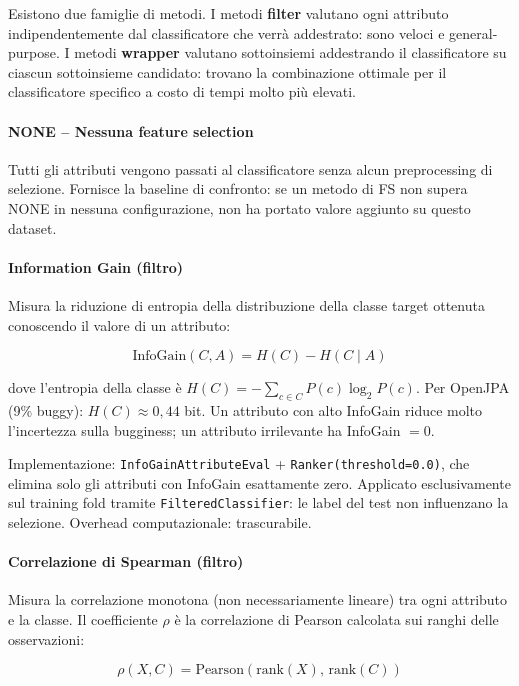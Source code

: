 Esistono due famiglie di metodi. I metodi \textbf{filter} valutano ogni attributo
indipendentemente dal classificatore che verrà addestrato: sono veloci e general-purpose.
I metodi \textbf{wrapper} valutano sottoinsiemi addestrando il classificatore su ciascun
sottoinsieme candidato: trovano la combinazione ottimale per il classificatore specifico
a costo di tempi molto più elevati.

\paragraph{NONE -- Nessuna feature selection}

Tutti gli attributi vengono passati al classificatore senza alcun preprocessing di
selezione. Fornisce la baseline di confronto: se un metodo di FS non supera NONE in
nessuna configurazione, non ha portato valore aggiunto su questo dataset.

\paragraph{Information Gain (filtro)}

Misura la riduzione di entropia della distribuzione della classe target ottenuta
conoscendo il valore di un attributo:

\[
\text{InfoGain}(C, A) = H(C) - H(C \mid A)
\]

dove l'entropia della classe è $H(C) = -\sum_{c \in C} P(c) \log_2 P(c)$. Per OpenJPA
(9\% buggy): $H(C) \approx 0{,}44$ bit. Un attributo con alto InfoGain riduce molto
l'incertezza sulla bugginess; un attributo irrilevante ha InfoGain $= 0$.

Implementazione: \texttt{InfoGainAttributeEval} + \texttt{Ranker(threshold=0.0)}, che
elimina solo gli attributi con InfoGain esattamente zero. Applicato esclusivamente sul
training fold tramite \texttt{FilteredClassifier}: le label del test non influenzano la
selezione. Overhead computazionale: trascurabile.

\paragraph{Correlazione di Spearman (filtro)}

Misura la correlazione monotona (non necessariamente lineare) tra ogni attributo e la
classe. Il coefficiente $\rho$ è la correlazione di Pearson calcolata sui ranghi delle
osservazioni:

\[
\rho(X, C) = \text{Pearson}(\text{rank}(X),\, \text{rank}(C))
\]

